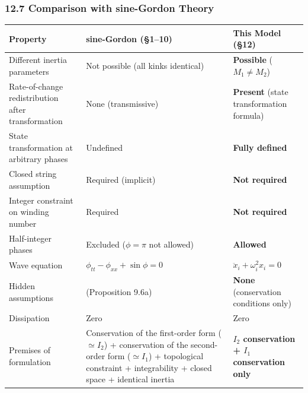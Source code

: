 \documentclass[a4paper,11pt]{article}
\newcounter{none}
\begin{document}
\subsubsection{12.7 Comparison with sine-Gordon
Theory}\label{comparison-with-sine-gordon-theory}

{\def\LTcaptype{none} %
\begin{longtable}[]{@{}
  >{\raggedright\arraybackslash}p{}
  >{\raggedright\arraybackslash}p{}
  >{\raggedright\arraybackslash}p{}@{}}
\toprule\noalign{}
\begin{minipage}[b]{\linewidth}\raggedright
Property
\end{minipage} & \begin{minipage}[b]{\linewidth}\raggedright
sine-Gordon (§1--10)
\end{minipage} & \begin{minipage}[b]{\linewidth}\raggedright
This Model (§12)
\end{minipage} \\
\midrule\noalign{}
\endhead
\bottomrule\noalign{}
\endlastfoot
Different inertia parameters & Not possible (all kinks identical) &
\textbf{Possible} (\(M_1 \neq M_2\)) \\
Rate-of-change redistribution after transformation & None (transmissive)
& \textbf{Present} (state transformation formula) \\
State transformation at arbitrary phases & Undefined & \textbf{Fully
defined} \\
Closed string assumption & Required (implicit) & \textbf{Not
required} \\
Integer constraint on winding number & Required & \textbf{Not
required} \\
Half-integer phases & Excluded (\(\phi = \pi\) not allowed) &
\textbf{Allowed} \\
Wave equation & \(\phi_{tt} - \phi_{xx} + \sin\phi = 0\) &
\(\ddot{x}_i + \omega_i^2 x_i = 0\) \\
Hidden assumptions & 6 (Proposition 9.6a) & \textbf{None} (conservation
conditions only) \\
Dissipation & Zero & Zero \\
Premises of formulation & Conservation of the first-order form
(\(\simeq I_2\)) + conservation of the second-order form
(\(\simeq I_1\)) + topological constraint + integrability + closed space
+ identical inertia & \textbf{\(I_2\) conservation + \(I_1\)
conservation only} \\
\end{longtable}
}
\end{document}
